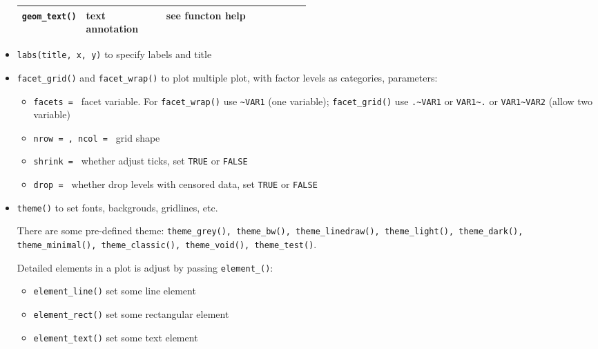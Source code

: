 \begin{itemize}[topsep=2pt,itemsep=0pt]
\begin{table}[H]
\begin{tabularx}{0.9\linewidth}{XXp{0.5\linewidth}}
        \lstinline|geom_text()|     &text annotation        &see functon help\\
        \hline
        \hline
    \end{tabularx}
\end{table}
        \item \lstinline|labs(title, x, y)| to specify labels and title
        \item \lstinline|facet_grid()| and \lstinline|facet_wrap()| to plot multiple plot, with factor levels as categories, parameters:
        \begin{itemize}[topsep=2pt,itemsep=0pt]
            \item \lstinline|facets = | facet variable. For \lstinline|facet_wrap()| use \lstinline|~VAR1| (one variable); \lstinline|facet_grid()| use \lstinline|.~VAR1| or \lstinline|VAR1~.| or \lstinline|VAR1~VAR2| (allow two variable)
            \item \lstinline|nrow = , ncol = | grid shape
            \item \lstinline|shrink = | whether adjust ticks, set \lstinline|TRUE| or \lstinline|FALSE|
            \item \lstinline|drop = | whether drop levels with censored data, set \lstinline|TRUE| or \lstinline|FALSE|
        \end{itemize}
        \item \lstinline|theme()| to set fonts, backgrouds, gridlines, etc. 
        
        There are some pre-defined theme: \lstinline|theme_grey(), theme_bw(), theme_linedraw(), theme_light(), theme_dark(), theme_minimal(), theme_classic(), theme_void(), theme_test()|.
        
        
        Detailed elements in a plot is adjust by passing \lstinline|element_()|:
        \begin{itemize}[topsep=2pt,itemsep=0pt]
            \item \lstinline|element_line()| set some line element
            \item \lstinline|element_rect()| set some rectangular element
            \item \lstinline|element_text()| set some text element
        \end{itemize}
        

\end{itemize}
